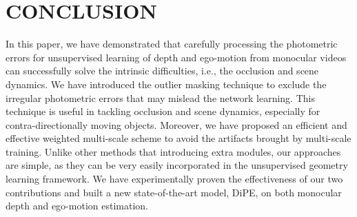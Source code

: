 \documentclass[letterpaper, 10 pt, conference]{ieeeconf}
\begin{document}
\section{CONCLUSION}
In this paper, we have demonstrated that carefully processing the photometric errors for unsupervised learning of depth and ego-motion from monocular videos can successfully solve the intrinsic difficulties, i.e., the occlusion and scene dynamics. 
We have introduced the outlier masking technique to exclude the irregular photometric errors that may mislead the network learning. This technique is useful in tackling occlusion and scene dynamics, especially for contra-directionally moving objects. Moreover, we have proposed an efficient and effective weighted multi-scale scheme to avoid the artifacts brought by multi-scale training. 
Unlike other methods that introducing extra modules, our approaches are simple, as they can be very easily incorporated in the unsupervised geometry learning framework. 
We have experimentally proven the effectiveness of our two contributions and built a new state-of-the-art model, DiPE, on both monocular depth and ego-motion estimation. 


{\small


}
\end{document}
